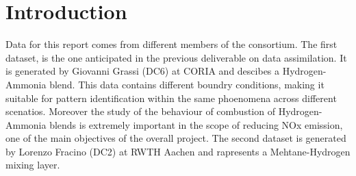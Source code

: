 \section{Introduction}
Data for this report comes from different members of the consortium. The first dataset, is the one anticipated in the previous deliverable on data assimilation. It is generated by Giovanni Grassi (DC6) at CORIA and descibes a Hydrogen-Ammonia blend. This data contains different boundry conditions, making it suitable for pattern identification within the same phoenomena across different scenatios. Moreover the study of the behaviour of combustion of Hydrogen-Ammonia blends is extremely important in the scope of reducing NOx emission, one of the main objectives of the overall project.
The second dataset is generated by Lorenzo Fracino (DC2) at RWTH Aachen and rapresents a Mehtane-Hydrogen mixing layer.